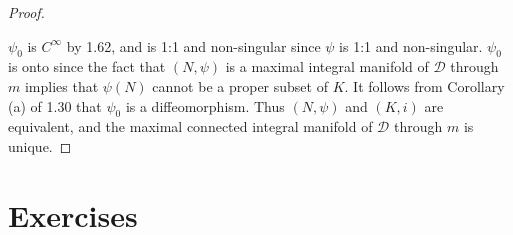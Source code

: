 \begin{proof}
	\begin{center}
	\end{center}

	$\psi_{0}$ is $C^{\infty}$ by 1.62, and is 1:1 and non-singular since $\psi$ is 1:1 and non-singular. $\psi_{0}$ is onto since the fact that $(N,\psi)$ is a maximal integral manifold of $\mathcal{D}$ through $m$ implies that $\psi(N)$ cannot be a proper subset of $K$. It follows from Corollary (a) of 1.30 that $\psi_{0}$ is a diffeomorphism. Thus $(N,\psi)$ and $(K,i)$ are equivalent, and the maximal connected integral manifold of $\mathcal{D}$ through $m$ is unique.

\end{proof}

\section{Exercises}

